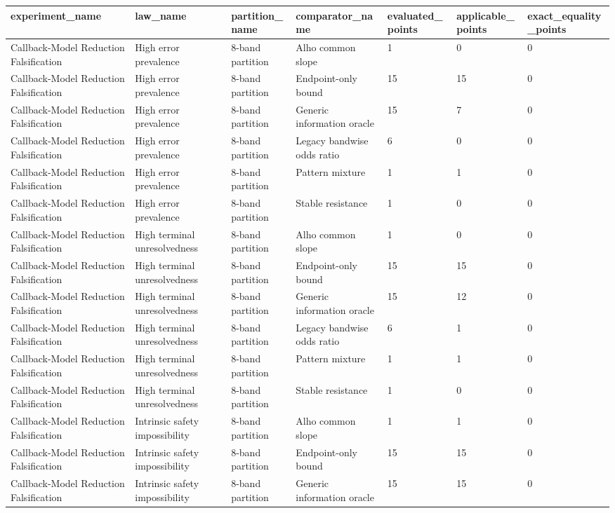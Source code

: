 \begin{tabular}{lllllll}
\toprule
experiment\_name & law\_name & partition\_name & comparator\_name & evaluated\_points & applicable\_points & exact\_equality\_points \\
\midrule
Callback-Model Reduction Falsification & High error prevalence & 8-band partition & Alho common slope & 1 & 0 & 0 \\
Callback-Model Reduction Falsification & High error prevalence & 8-band partition & Endpoint-only bound & 15 & 15 & 0 \\
Callback-Model Reduction Falsification & High error prevalence & 8-band partition & Generic information oracle & 15 & 7 & 0 \\
Callback-Model Reduction Falsification & High error prevalence & 8-band partition & Legacy bandwise odds ratio & 6 & 0 & 0 \\
Callback-Model Reduction Falsification & High error prevalence & 8-band partition & Pattern mixture & 1 & 1 & 0 \\
Callback-Model Reduction Falsification & High error prevalence & 8-band partition & Stable resistance & 1 & 0 & 0 \\
Callback-Model Reduction Falsification & High terminal unresolvedness & 8-band partition & Alho common slope & 1 & 0 & 0 \\
Callback-Model Reduction Falsification & High terminal unresolvedness & 8-band partition & Endpoint-only bound & 15 & 15 & 0 \\
Callback-Model Reduction Falsification & High terminal unresolvedness & 8-band partition & Generic information oracle & 15 & 12 & 0 \\
Callback-Model Reduction Falsification & High terminal unresolvedness & 8-band partition & Legacy bandwise odds ratio & 6 & 1 & 0 \\
Callback-Model Reduction Falsification & High terminal unresolvedness & 8-band partition & Pattern mixture & 1 & 1 & 0 \\
Callback-Model Reduction Falsification & High terminal unresolvedness & 8-band partition & Stable resistance & 1 & 0 & 0 \\
Callback-Model Reduction Falsification & Intrinsic safety impossibility & 8-band partition & Alho common slope & 1 & 1 & 0 \\
Callback-Model Reduction Falsification & Intrinsic safety impossibility & 8-band partition & Endpoint-only bound & 15 & 15 & 0 \\
Callback-Model Reduction Falsification & Intrinsic safety impossibility & 8-band partition & Generic information oracle & 15 & 15 & 0 \\

\end{tabular}
